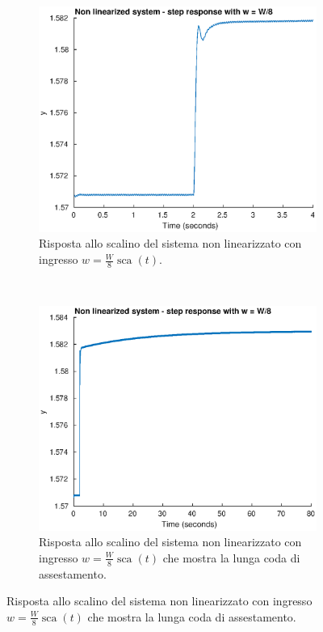 \documentclass[a4paper]{article}
\DeclareMathOperator*{\sca}{\textrm{sca}}
\begin{document}
\begin{figure}[h]
    \centering
\begin{subfigure}[t]{0.48\textwidth}
    \centering
    \includegraphics[width=\textwidth]{step_nonlin_short}
    \caption{Risposta allo scalino del sistema non linearizzato con ingresso $w = \frac{W}{8} \sca (t)$.}
    \label{fig:step_sim_nonlin}
\end{subfigure}
~
\begin{subfigure}[t]{0.48\textwidth}
    \centering
    \includegraphics[width=\textwidth]{step_nonlin_long}
    \caption{Risposta allo scalino del sistema non linearizzato con ingresso $w = \frac{W}{8} \sca (t)$ che mostra la lunga coda di assestamento.}
    \label{fig:step_sim_nonlin_long}
\end{subfigure}
\end{figure}
\end{document}

